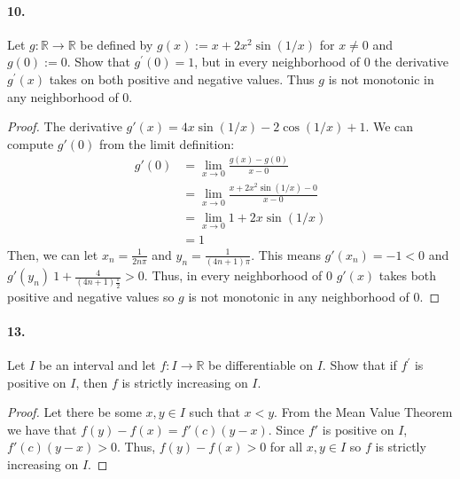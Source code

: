 \documentclass[12pt]{article}
\theoremstyle{remark}
\begin{document}
\paragraph{10.} Let $g: \mathbb{R} \rightarrow \mathbb{R}$ be defined by $g(x):=x+2 x^2 \sin (1 / x)$ for $x \neq 0$ and $g(0):=0$. Show that $g^{\prime}(0)=1$, but in every neighborhood of 0 the derivative $g^{\prime}(x)$ takes on both positive and negative values. Thus $g$ is not monotonic in any neighborhood of 0.
\begin{proof}
    The derivative $g'(x) = 4x\sin(1/x) - 2\cos(1/x) + 1$. We can compute $g'(0)$ from the limit definition:
    \begin{align*}
        g'(0) &= \lim_{x \to 0} \frac{g(x) - g(0)}{x - 0} \\
        &= \lim_{x \to 0} \frac{x + 2x^2\sin(1/x) - 0}{x - 0} \\
        &= \lim_{x \to 0} 1 + 2x\sin(1/x) \\
        &= 1
    \end{align*}
    Then, we can let $x_n = \frac{1}{2n\pi}$ and $y_n = \frac{1}{(4n + 1)\pi}$. This means $g'(x_n) = -1 < 0$ and $g'(y_n) ~ 1 + \frac{4}{(4n + 1) \frac{\pi}{2}} > 0$. Thus, in every neighborhood of 0 $g'(x)$ takes both positive and negative values so $g$ is not monotonic in any neighborhood of 0.
\end{proof}

\paragraph{13.} Let $I$ be an interval and let $f: I \rightarrow \mathbb{R}$ be differentiable on $I$. Show that if $f^{\prime}$ is positive on $I$, then $f$ is strictly increasing on $I$.
\begin{proof}
    Let there be some $x, y \in I$ such that $x < y$. From the Mean Value Theorem we have that $f(y) - f(x) = f'(c)(y - x)$. Since $f'$ is positive on $I$, $f'(c)(y - x) > 0$. Thus, $f(y) - f(x) > 0$ for all $x, y \in I$ so $f$ is strictly increasing on $I$.
\end{proof}
\end{document}
